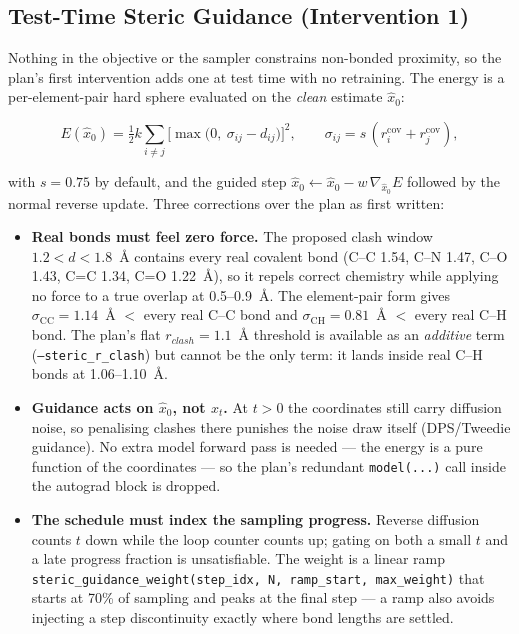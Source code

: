 \documentclass[12pt, a4paper]{article}
\begin{document}
\subsection{Test-Time Steric Guidance (Intervention 1)}

Nothing in the objective or the sampler constrains non-bonded proximity, so the
plan's first intervention adds one at test time with no retraining. The energy
is a per-element-pair hard sphere evaluated on the \emph{clean} estimate
$\hat{x}_0$:

\begin{equation}
    E(\hat{x}_0) = \tfrac{1}{2} k \sum_{i \ne j}
        \big[\max\big(0,\ \sigma_{ij} - d_{ij}\big)\big]^2,
    \qquad \sigma_{ij} = s\,(r_i^{\mathrm{cov}} + r_j^{\mathrm{cov}}),
\end{equation}

with $s = 0.75$ by default, and the guided step
$\hat{x}_0 \leftarrow \hat{x}_0 - w\,\nabla_{\hat{x}_0} E$ followed by the
normal reverse update. Three corrections over the plan as first written:

\begin{itemize}
    \item \textbf{Real bonds must feel zero force.} The proposed clash window
          $1.2 < d < 1.8$~\AA{} contains every real covalent bond (C--C 1.54,
          C--N 1.47, C--O 1.43, C=C 1.34, C=O 1.22~\AA{}), so it repels
          correct chemistry while applying no force to a true overlap at
          0.5--0.9~\AA{}. The element-pair form gives $\sigma_{\mathrm{CC}} =
          1.14$~\AA{} $<$ every real C--C bond and $\sigma_{\mathrm{CH}} =
          0.81$~\AA{} $<$ every real C--H bond. The plan's flat
          $r_{clash} = 1.1$~\AA{} threshold is available as an \emph{additive}
          term (\texttt{--steric\_r\_clash}) but cannot be the only term: it
          lands inside real C--H bonds at 1.06--1.10~\AA{}.
    \item \textbf{Guidance acts on $\hat{x}_0$, not $x_t$.} At $t > 0$ the
          coordinates still carry diffusion noise, so penalising clashes there
          punishes the noise draw itself (DPS/Tweedie guidance). No extra model
          forward pass is needed --- the energy is a pure function of the
          coordinates --- so the plan's redundant \texttt{model(...)} call
          inside the autograd block is dropped.
    \item \textbf{The schedule must index the sampling progress.} Reverse
          diffusion counts $t$ down while the loop counter counts up; gating on
          both a small $t$ and a late progress fraction is unsatisfiable. The
          weight is a linear ramp \texttt{steric\_guidance\_weight(step\_idx,
          N, ramp\_start, max\_weight)} that starts at 70\% of sampling and
          peaks at the final step --- a ramp also avoids injecting a step
          discontinuity exactly where bond lengths are settled.
\end{itemize}
\end{document}
